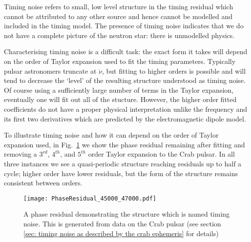 Timing noise refers to small, low level structure in the timing residual which
cannot be attributed to any other source and hence cannot be modelled and
included in the timing model. The presence of timing noise indicates that we do
not have a complete picture of the neutron star: there is unmodelled physics.

Characterising timing noise is a difficult task: the exact form it takes will
depend on the order of Taylor expansion used to fit the timing parameters. Typically
pulsar astronomers truncate at $\ddot{\nu}$, but fitting to higher orders is
possible and will tend to decrease the `level' of the resulting structure
understood as timing noise. Of course using a sufficiently large number of
terms in the Taylor expansion, eventually one will fit out all of the stucture.
However, the higher order fitted coefficients do not have a proper physical
interpretation unlike the frequency and its first two derivatives which are
predicted by the electromagnetic dipole model.

To illustrate timing noise and how it can depend on the order of Taylor expansion
used, in Fig.~\ref{fig: timing noise example} we show the phase residual remaining
after fitting and removing a $3^{rd}$, $4^{th}$, and $5^{th}$ order Taylor expansion to
the Crab pulsar. In all three instances we see a quasi-periodic structure reaching
residuals up to half a cycle; higher order have lower residuals, but the form
of the structure remains consistent between orders.
\begin{figure}[htb]
    \centering
    \texttt{[image: PhaseResidual\_45000\_47000.pdf]}
    \caption{A phase residual demonstrating the structure which is named timing
        noise. This is generated from data on the Crab pulsar (see section
    \ref{sec: timing noise as described by the crab ephemeris} for details)}
    \label{fig: timing noise example}
\end{figure}

